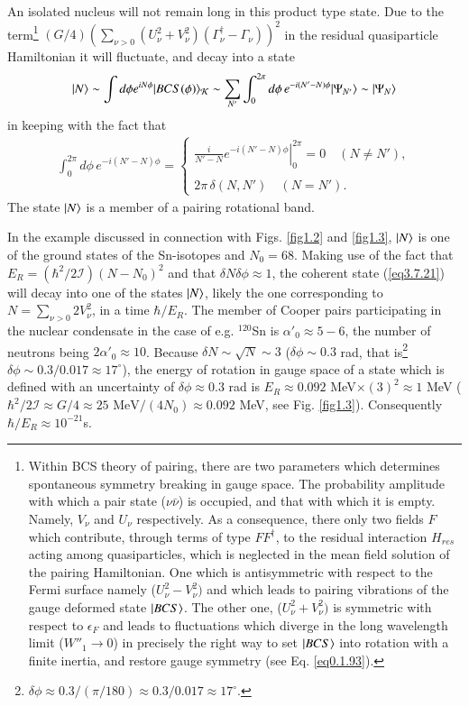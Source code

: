 An isolated nucleus will not remain long in this product type state. Due to the term\footnote{Within BCS theory of pairing, there are two parameters which determines spontaneous symmetry breaking in gauge space. The probability amplitude with which a pair state ($\nu\bar{\nu}$) is occupied, and that with which it is empty. Namely, $V_\nu$ and $U_\nu$ respectively. As a consequence, there only two fields $F$ which contribute, through terms of type $FF^\dagger$, to the residual interaction $H_{res}$ acting among quasiparticles, which is neglected in the mean field solution of the pairing Hamiltonian. One which is antisymmetric with respect to the Fermi surface namely ($U^2_\nu-V^2_\nu)$ and which leads to pairing vibrations of the gauge deformed state $|{BCS} \rangle$. The other one, ($U^2_\nu+V^2_\nu)$ is symmetric with respect to $\epsilon_F$ and leads to fluctuations which diverge in the long wavelength limit ($W''_1\to0$) in precisely the right way to set $|{BCS} \rangle$ into rotation with a finite inertia, and restore gauge symmetry (see Eq. \ref{eq0.1.93}).}  $(G/4)\left(\sum_{\nu>0}\left(U^2_\nu+V^2_\nu\right)\left(\Gamma_\nu^\dagger-\Gamma_\nu\right)\right)^2$ in the residual quasiparticle Hamiltonian it will fluctuate, and decay into a state
\begin{align}\label{eqbeta}
|N\rangle \sim \int d\phi e^{iN\phi}|BCS(\phi)\rangle_{\mathcal{K}}\sim \sum_{N'}\int_0^{2\pi}d\phi\, e^{-i(N'-N)\phi}|{\Psi_{N'}} \rangle\sim|{\Psi_{N}} \rangle
\end{align}
in keeping with the fact that
\begin{align}\label{eq3.7.27}
\int_0^{2\pi}d\phi\, e^{-i(N'-N)\phi}=\left\{
\begin{array}{l}
\left.\frac{i}{N'-N}e^{-i(N'-N)\phi}\right|^{2\pi}_0=0\quad (N\neq N'),\\ 
 \\
 2\pi\,\delta(N,N')\quad (N= N').
\end{array} \right.
\end{align}
The state $|{N} \rangle$ is a member of a pairing rotational band.


In the example discussed in connection with Figs. \ref{fig1.2} and \ref{fig1.3}, $|{N} \rangle$ is one of the ground states of the Sn-isotopes and $N_0=68$. Making use of the fact that $E_R=\left(\hbar^2/2\mathcal I\right)(N-N_0)^2$ and that $\delta N\delta\phi\approx1$, the coherent state (\ref{eq3.7.21}) will decay into one of the states $|{N} \rangle$, likely the one corresponding to $N=\sum_{\nu>0}2V_\nu^2$, in a time $\hbar/E_R$. The member of  Cooper pairs participating in the nuclear condensate in the case of e.g. $^{120}$Sn is $\alpha'_0\approx5-6$, the number of neutrons being $2\alpha'_0\approx10$. Because $\delta N\sim\sqrt{N}\sim3$ ($\delta\phi\sim0.3$ rad, that is\footnote{$\delta\phi\approx0.3/(\pi/180)\approx0.3/0.017\approx17^\circ$.} $\delta\phi\sim0.3/0.017\approx 17^\circ$), the energy of rotation in gauge space of a state which is defined with an uncertainty of $\delta\phi\approx0.3$ rad is  $E_R\approx0.092$ MeV$\times(3)^2\approx 1$ MeV ($\hbar^2/2\mathcal I\approx G/4\approx 25\text{ MeV}/(4N_0)\approx0.092$ MeV, see Fig. \ref{fig1.3}). Consequently $\hbar/E_R\approx10^{-21}$s. 



